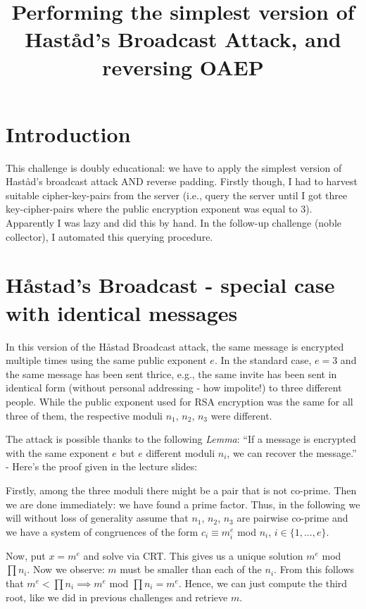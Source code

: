 \documentclass{article}
\title{Performing the simplest version of Hast{\aa}d's Broadcast Attack, and reversing OAEP}
\begin{document}
\maketitle

\section{Introduction}

This challenge is doubly educational: we have to apply the simplest version of Hast{\aa}d's broadcast attack AND reverse padding. Firstly though, I had to harvest suitable cipher-key-pairs from the server (i.e., query the server until I got three key-cipher-pairs where the public encryption exponent was equal to 3). Apparently I was lazy and did this by hand. In the follow-up challenge (noble collector), I automated this querying procedure.

\section{H{\aa}stad's Broadcast - special case with identical messages}

In this version of the H{\aa}stad Broadcast attack, the same message is encrypted multiple times using the same public exponent $e$. In the standard case, $e=3$ and the same message has been sent thrice, e.g., the same invite has been sent in identical form (without personal addressing - how impolite!) to three different people. While the public exponent used for RSA encryption was the same for all three of them, the respective moduli $n_1$, $n_2$, $n_3$ were different.\medskip

The attack is possible thanks to the following \emph{Lemma}: ``If a message is encrypted with the same exponent $e$ but $e$ different moduli $n_i$, we can recover the message.'' - Here's the proof given in the lecture slides:\medskip

Firstly, among the three moduli there might be a pair that is not co-prime. Then we are done immediately: we have found a prime factor. Thus, in the following we will without loss of generality assume that $n_1$, $n_2$, $n_3$ are pairwise co-prime and we have a system of congruences of the form $c_i \equiv m_i^{e}$ mod $n_i$, $i \in \{1,...,e\}$.\medskip

Now, put $x=m^{e}$ and solve via CRT. This gives us a unique solution $m^{e}$ mod $\prod n_i$. Now we observe: $m$ must be smaller than each of the $n_i$. From this follows that $m^{e} < \prod n_i \implies m^{e}$ mod $\prod n_i = m^{e}$. Hence, we can just compute the third root, like we did in previous challenges and retrieve $m$. 
\end{document}

